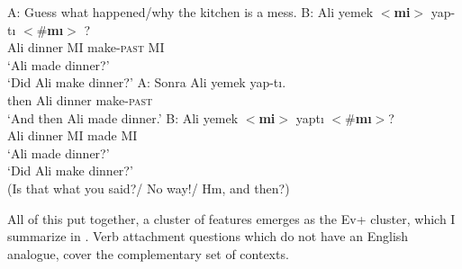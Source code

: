 \documentclass[output=paper,colorlinks,citecolor=brown]{langscibook}
\begin{document}

\ea\label{ex:11:24} A:
Guess what happened/why the kitchen is a mess.
\sn B: \gll Ali  yemek  $<$\textbf{mi}$>$ yap-tı{} $<$\#\textbf{mı}$>$ ?\\
Ali  dinner \phantom{ss}MI make-\textsc{past} \phantom{sss}MI\\
\glt \phantom{B:} `Ali made dinner?’\\
\phantom{B:} `Did Ali make dinner?’
\ex \label{immres} 
A: \gll Sonra Ali yemek yap-tı.\\
then Ali dinner make-\textsc{past}\\
\glt \phantom{B:} `And then Ali made dinner.'
\sn B: \gll Ali yemek $<$\textbf{mi}$>$ yaptı{} $<$\#\textbf{mı}$>$?\\
Ali  dinner \phantom{ss}MI made \phantom{sss}MI\\
\glt \phantom{B:} `Ali made dinner?’\\
\phantom{B:} `Did Ali make dinner?’ \\
\phantom{B:} (Is that what you said?/ No way!/ Hm, and then?)
\z

All of this put together, a cluster of features emerges as the Ev+ cluster, which I summarize in . Verb attachment questions which do not have an English analogue, cover the complementary set of contexts.
\end{document}
